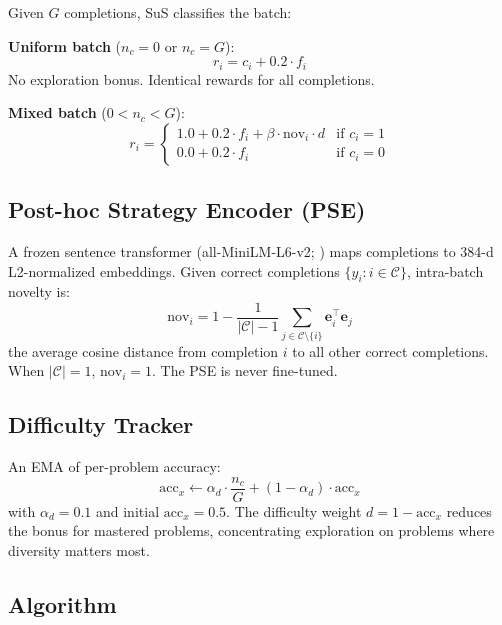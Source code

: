 \documentclass[10pt]{article}
\begin{document}
Given $G$ completions, SuS classifies the batch:

\textbf{Uniform batch} ($n_c = 0$ or $n_c = G$):
\begin{equation}
    r_i = c_i + 0.2 \cdot f_i
\end{equation}
No exploration bonus. Identical rewards for all completions.

\textbf{Mixed batch} ($0 < n_c < G$):
\begin{equation}
    r_i = \begin{cases}
        1.0 + 0.2 \cdot f_i + \beta \cdot \text{nov}_i \cdot d & \text{if } c_i = 1 \\
        0.0 + 0.2 \cdot f_i & \text{if } c_i = 0
    \end{cases}
    \label{eq:sus_reward}
\end{equation}

\subsection{Post-hoc Strategy Encoder (PSE)}
\label{sec:pse}

A frozen sentence transformer (all-MiniLM-L6-v2; \citealp{reimers2019sentencebert, wang2020minilm}) maps completions to 384-d L2-normalized embeddings. Given correct completions $\{y_i : i \in \mathcal{C}\}$, intra-batch novelty is:
\begin{equation}
    \text{nov}_i = 1 - \frac{1}{|\mathcal{C}| - 1} \sum_{j \in \mathcal{C} \setminus \{i\}} \mathbf{e}_i^\top \mathbf{e}_j
    \label{eq:novelty}
\end{equation}
the average cosine distance from completion $i$ to all other correct completions. When $|\mathcal{C}| = 1$, $\text{nov}_i = 1$. The PSE is never fine-tuned.

\subsection{Difficulty Tracker}
\label{sec:difficulty}

An EMA of per-problem accuracy:
\begin{equation}
    \text{acc}_x \leftarrow \alpha_d \cdot \frac{n_c}{G} + (1 - \alpha_d) \cdot \text{acc}_x
\end{equation}
with $\alpha_d = 0.1$ and initial $\text{acc}_x = 0.5$. The difficulty weight $d = 1 - \text{acc}_x$ reduces the bonus for mastered problems, concentrating exploration on problems where diversity matters most.

\subsection{Algorithm}
\end{document}
